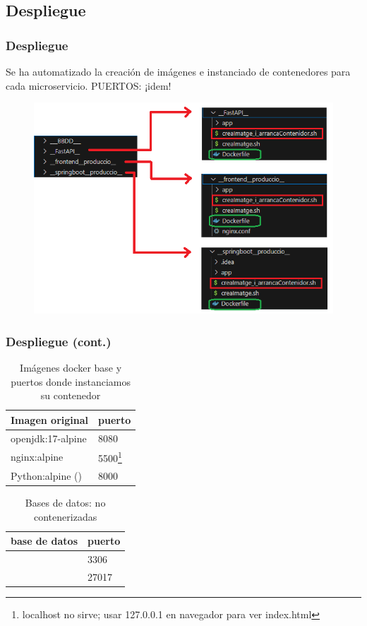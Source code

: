 \documentclass{beamer}
\begin{document}
	
	
	

	\subsection{Despliegue}
	\begin{frame}
		\frametitle{Despliegue}
		Se ha automatizado la creación de imágenes e instanciado de contenedores para cada microservicio. PUERTOS: ¡idem!
		
		\begin{figure}
			\centering
			\includegraphics[width=.7\linewidth]{../img/dockeritzacioAplicacioPlantilla}
			\label{fig:dockeritzacioaplicacioplantilla}
		\end{figure}
	\end{frame}
	
	
	\begin{frame}
		\frametitle{Despliegue (cont.)}
		
		
		\begin{table}[h!]
			\centering
			\begin{tabular}{|l|l|}
				\hline
				\textbf{Imagen original} & \textbf{puerto} \\
				\hline
				
				openjdk:17-alpine & 8080 \\
				nginx:alpine & 5500\footnote{localhost no sirve; usar 127.0.0.1 en navegador para ver index.html} \\
				Python:alpine (\href{https://shorturl.at/YdNuy}{\color{blue}{DF}}) & 8000 \\
		
				\hline
			\end{tabular}
			\caption{Imágenes docker base y puertos donde instanciamos su contenedor}
		\end{table}		
	
	
		\begin{table}[h!]
		\centering
			\begin{tabular}{|l|l|}
				\hline
				\textbf{base de datos} & \textbf{puerto} \\
				\hline
				
				\color{red}{MySQL} & 3306 \\
				\color{red}{MongoDB} & 27017 \\
		
				\hline
			\end{tabular}
			\caption{Bases de datos: no contenerizadas}
		\end{table}		
	\end{frame}
	
\end{document}
